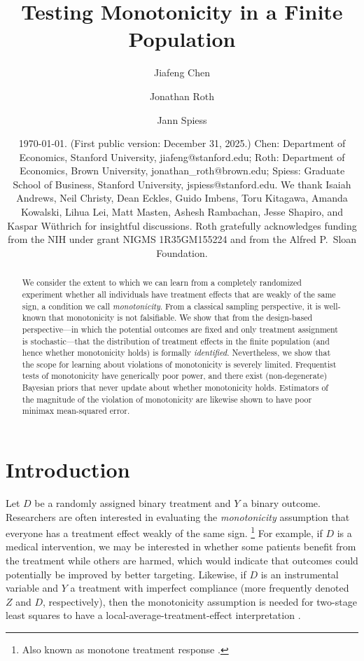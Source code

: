 \documentclass[12pt,reqno]{amsart}
\title{Testing Monotonicity in a Finite Population} %
\author{Jiafeng Chen \and Jonathan Roth \and Jann Spiess}
\date{\today. (First public version: December 31, 2025.) Chen: Department of Economics, Stanford University, jiafeng@stanford.edu; Roth: Department of Economics, Brown University, jonathan\_roth@brown.edu; Spiess: Graduate School of Business, Stanford University, jspiess@stanford.edu. We thank Isaiah Andrews, Neil Christy, Dean Eckles, Guido Imbens, Toru Kitagawa, Amanda Kowalski, Lihua Lei, Matt Masten, Ashesh Rambachan, Jesse Shapiro, and Kaspar Wüthrich for insightful discussions. Roth gratefully acknowledges funding from the NIH under grant NIGMS 1R35GM155224 and from the Alfred P.\ Sloan Foundation.}
\theoremstyle{theorem}
\theoremstyle{definition}
\newcommand{\0}{\mathbf{0}}
\newcommand{\1}{\mathbf{1}}
\begin{document}
\maketitle

\begin{abstract}
We consider the extent to which we can learn from a completely randomized experiment
whether all individuals have treatment effects that are weakly of the same sign, a condition we
call \emph{monotonicity}. From a classical sampling perspective, it is well-known that monotonicity is not falsifiable. We show that from the design-based perspective—in which the potential outcomes are fixed and only treatment assignment is stochastic—that the distribution of treatment effects in the
finite population (and hence whether monotonicity holds) is formally \emph{identified}. Nevertheless, we show that the scope for learning about violations of monotonicity is severely limited. Frequentist tests of monotonicity have generically poor power, and there exist (non-degenerate) Bayesian priors that never update about whether monotonicity holds. Estimators of the magnitude of the violation of monotonicity are likewise shown to have poor minimax mean-squared error. 


\end{abstract}

\newpage 

\section{Introduction}

Let $D$ be a randomly assigned binary treatment and $Y$ a binary outcome. Researchers are
often interested in evaluating the \emph{monotonicity} assumption that everyone has a treatment effect weakly of the same sign.%
\footnote{Also known as monotone treatment response \citep{manski1997monotone}.}
For
example, if $D$ is a medical intervention, we may be interested in whether some patients benefit from the treatment while others are harmed, which would indicate that outcomes could potentially be improved by better targeting.
Likewise, if $D$ is an
instrumental variable and $Y$ a treatment with imperfect compliance (more frequently
denoted $Z$ and $D$, respectively), then the monotonicity assumption is needed for
two-stage least squares to have a local-average-treatment-effect interpretation
\citep{AngristImbens(94)}.
\end{document}
